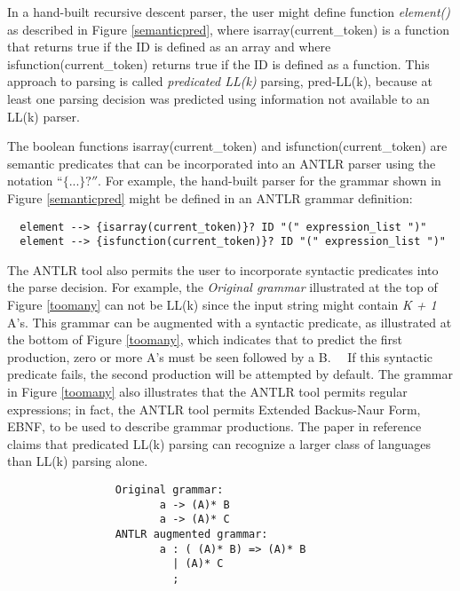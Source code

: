 In a hand-built recursive descent parser, the user
might define function {\em element()}
as described in Figure \ref{semanticpred},
where {\sf isarray(current\_token)} is a function that
returns true if the ID is defined as an array and
where {\sf isfunction(current\_token)} returns
true if the ID is defined as a function.
This approach to parsing is called {\em predicated LL(k)}
parsing, {\sf pred-LL(k)}, because at least
one parsing decision was predicted using information
not available to an LL(k) parser.

The boolean functions {\sf isarray(current\_token)} and
{\sf isfunction(current\_token)} are semantic
predicates that can be incorporated into an ANTLR
parser using the notation {\sf ``$\{...\}?''$}.
For example, the hand-built parser for the grammar shown in
Figure \ref{semanticpred} might be defined in an
ANTLR grammar definition: 

\singlespace
\begin{verbatim}
  element --> {isarray(current_token)}? ID "(" expression_list ")"
  element --> {isfunction(current_token)}? ID "(" expression_list ")"
\end{verbatim}
\doublespace

The ANTLR tool also permits the user to incorporate 
syntactic predicates into the parse decision.
For example, the {\em Original grammar} illustrated
at the top of Figure \ref{toomany} can not be LL(k) since
the input string might contain {\em K + 1} A's.
This grammar can be augmented with a syntactic predicate,
as illustrated at the bottom of Figure \ref{toomany},
which indicates that to predict the first production,
zero or more A's must be seen followed by a B.~~
If this syntactic predicate fails, the second production
will be attempted by default.
The grammar in Figure \ref{toomany} also illustrates
that the ANTLR tool permits regular expressions;
in fact, the ANTLR tool permits 
Extended Backus-Naur Form, EBNF, to be used
to describe grammar productions.
The paper in reference \cite{parr} claims
that predicated LL(k) parsing can recognize a
larger class of languages than LL(k) parsing alone.

\begin{figure*}[t]
\singlespace
\begin{verbatim}
                 Original grammar:
                        a -> (A)* B
                        a -> (A)* C
                 ANTLR augmented grammar:
                        a : ( (A)* B) => (A)* B
                          | (A)* C
                          ;
\end{verbatim}
  \caption{{\em Syntactic predicate}.}
\doublespace
  \label{toomany}
\figline
\end{figure*}

